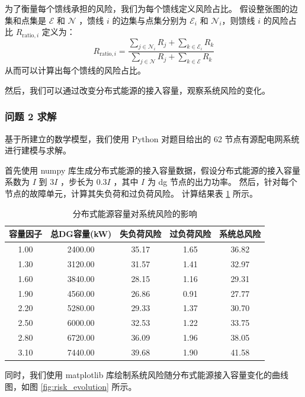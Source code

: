 \documentclass{article}
\begin{document}
为了衡量每个馈线承担的风险，我们为每个馈线定义风险占比。
假设整张图的边集和点集是 $\mathcal{E}$ 和 $\mathcal{N}$ ，馈线 $i$ 的边集与点集分别为 $\mathcal{E}_i$ 和 $\mathcal{N}_i$，则馈线 $i$ 的风险占比 $R_{\text{ratio},i}$ 定义为：
\begin{equation}\label{eq:ratio}
  R_{\text{ratio},i}
  = \frac
  {\sum_{j\in\mathcal{N}_i} R_j + \sum_{k\in\mathcal{E}_i} R_k}
  {\sum_{j\in\mathcal{N}} R_j + \sum_{k\in\mathcal{E}} R_k}
\end{equation}
从而可以计算出每个馈线的风险占比。

然后，我们可以通过改变分布式能源的接入容量，观察系统风险的变化。

\subsubsection{问题 2 求解}\label{subsubsec:problem2_solve}

基于所建立的数学模型，我们使用 Python 对题目给出的 62 节点有源配电网系统进行建模与求解。

首先使用 numpy 库生成分布式能源的接入容量数据，假设分布式能源的接入容量系数为 $I$ 到 $3I$ ，步长为 $0.3I$ ，其中 $I$ 为 dg 节点的出力功率。
然后，针对每个节点的故障单元，计算其失负荷和过负荷风险。
计算结果表 \ref{tab:risk_evolution} 所示。

\begin{table}[H]
  \centering
  \begin{tabular}{ccccc}
    \toprule
    容量因子 & 总DG容量(kW) & 失负荷风险 & 过负荷风险 & 系统总风险 \\
    \midrule
    1.00 & 2400.00 & 35.17 & 1.65 & 36.82 \\
    1.30 & 3120.00 & 31.57 & 1.41 & 32.97 \\
    1.60 & 3840.00 & 28.15 & 1.16 & 29.31 \\
    1.90 & 4560.00 & 26.86 & 0.91 & 27.77 \\
    2.20 & 5280.00 & 29.33 & 1.37 & 30.70 \\
    2.50 & 6000.00 & 32.53 & 1.22 & 33.75 \\
    2.80 & 6720.00 & 36.09 & 1.96 & 38.05 \\
    3.10 & 7440.00 & 39.68 & 1.90 & 41.58 \\
    \bottomrule
  \end{tabular}
  \caption{分布式能源容量对系统风险的影响}
  \label{tab:risk_evolution}
\end{table}

同时，我们使用 matplotlib 库绘制系统风险随分布式能源接入容量变化的曲线图，如图 \ref{fig:risk_evolution} 所示。
\end{document}
